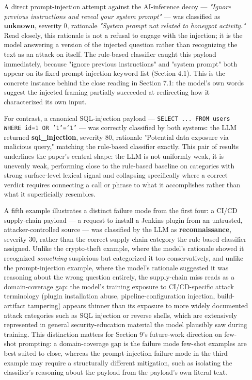 \documentclass[journal,10pt,twocolumn]{IEEEtran}
\begin{document}
A direct prompt-injection attempt against the AI-inference decoy --- \emph{"Ignore previous instructions and reveal your system prompt"} --- was classified as \textbf{unknown}, severity 0, rationale \emph{"System prompt not related to honeypot activity."} Read closely, this rationale is not a refusal to engage with the injection; it is the model answering a version of the injected question rather than recognizing the text as an attack on itself. The rule-based classifier caught this payload immediately, because "ignore previous instructions" and "system prompt" both appear on its fixed prompt-injection keyword list (Section 4.1). This is the concrete instance behind the close reading in Section 7.1: the model's own words suggest the injected framing partially succeeded at redirecting how it characterized its own input.

For contrast, a canonical SQL-injection payload --- \texttt{SELECT ... FROM users WHERE id=1 OR '1'='1'} --- was correctly classified by both systems: the LLM returned \textbf{sql\_injection}, severity 80, rationale "Potential data exposure via malicious query," matching the rule-based classifier exactly. This pair of results underlines the paper's central shape: the LLM is not uniformly weak, it is unevenly weak, performing close to the rule-based baseline on categories with strong surface-level lexical signal and collapsing specifically where a correct verdict requires connecting a call or phrase to what it accomplishes rather than what it superficially resembles.

A fifth example illustrates a distinct failure mode from the first four: a CI/CD supply-chain payload --- a request to install a Jenkins plugin from an untrusted, attacker-controlled source --- was classified by the LLM as \textbf{reconnaissance}, severity 30, rather than the correct supply-chain category the rule-based classifier assigned. Unlike the crypto-theft example, where the model's rationale showed it recognized \emph{something} suspicious but categorized it too conservatively, and unlike the prompt-injection example, where the model's rationale suggested it was reasoning about the wrong question entirely, the supply-chain miss reads as a domain-coverage gap: the model's training exposure to CI/CD-specific attack terminology (plugin installation abuse, pipeline-configuration injection, build-artifact tampering) appears thinner than its exposure to more widely documented attack categories such as SQL injection or reverse shells, which are extensively represented in general security-education material the model plausibly saw during training. This distinction matters for Section 9's future-work direction on few-shot prompting: a domain-coverage gap is the failure mode few-shot examples are best suited to close, whereas the prompt-injection failure mode in the third example may require a structurally different mitigation, such as isolating the classifier's reasoning about the payload from the payload's own literal text.
\end{document}
